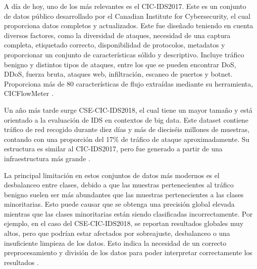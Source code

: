 A día de hoy, uno de los más relevantes es el CIC-IDS2017. Este es un conjunto de datos público desarrollado por el Canadian Institute for Cybersecurity, el cual proporciona datos completos y actualizados. Este fue diseñado teniendo en cuenta diversos factores, como la diversidad de ataques, necesidad de una captura completa, etiquetado correcto, disponibilidad de protocolos, metadatos y proporcionar un conjunto de características sólido y descriptivo. Incluye tráfico benigno y distintos tipos de ataques, entre los que se pueden encontrar DoS, DDoS, fuerza bruta, ataques web, infiltración, escaneo de puertos y botnet. Proporciona más de 80 características de flujo extraídas mediante su herramienta, CICFlowMeter \cite{sharafaldin2018cicids2017}.

Un año más tarde surge CSE-CIC-IDS2018, el cual tiene un mayor tamaño y está orientado a la evaluación de IDS en contextos de big data. Este dataset contiene tráfico de red recogido durante diez días y más de dieciséis millones de muestras, contando con una proporción del 17\% de tráfico de ataque aproximadamente. Su estructura es similar al CIC-IDS2017, pero fue generado a partir de una infraestructura más grande \cite{leevy2020csecicids2018}.

La principal limitación en estos conjuntos de datos más modernos es el desbalanceo entre clases, debido a que las muestras pertenecientes al tráfico benigno suelen ser más abundantes que las muestras pertenecientes a las clases minoritarias. Esto puede causar que se obtenga una precisión global elevada mientras que las clases minoritarias están siendo clasificadas incorrectamente. Por ejemplo, en el caso del CSE-CIC-IDS2018, se reportan resultados globales muy altos, pero que podrían estar afectados por sobreajuste, desbalanceo o una insuficiente limpieza de los datos. Esto indica la necesidad de un correcto preprocesamiento y división de los datos para poder interpretar correctamente los resultados \cite{leevy2020csecicids2018}.

